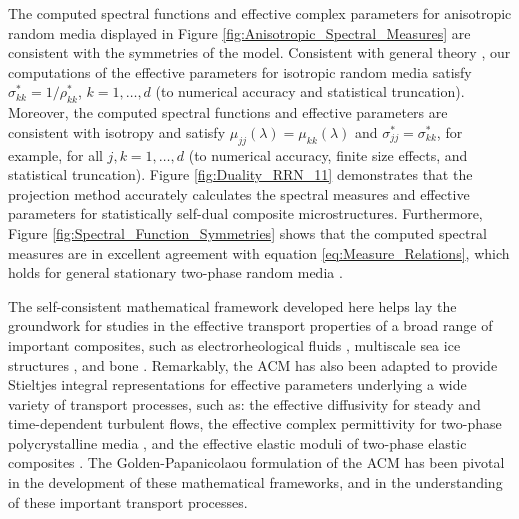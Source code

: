 \documentclass{cmslatex}
\renewcommand{\theequation}{\arabic{section}.\arabic{equation}}
\begin{document}
The computed spectral functions and effective complex parameters for
anisotropic random media displayed in Figure
\ref{fig:Anisotropic_Spectral_Measures}  are consistent with the
symmetries of the model. Consistent with general theory
\cite{MILTON:2002:TC}, our computations of the effective parameters
for isotropic random media 
satisfy $\sigma^*_{kk}=1/\rho^*_{kk}$, $k=1,\ldots,d$ (to numerical accuracy and
statistical truncation). Moreover, the computed spectral functions and
effective parameters are consistent with isotropy and satisfy
$\mu_{jj}(\lambda)=\mu_{kk}(\lambda)$ and $\sigma^*_{jj}=\sigma^*_{kk}$, for example, for all
$j,k=1,\ldots,d$ (to numerical accuracy, finite size effects, and
statistical truncation). Figure
\ref{fig:Duality_RRN_11} demonstrates that the projection method
accurately calculates the spectral measures and 
effective parameters for statistically self-dual composite
microstructures. Furthermore, Figure
\ref{fig:Spectral_Function_Symmetries} shows that the computed 
spectral measures are in excellent agreement with equation
\eqref{eq:Measure_Relations}, which holds for general stationary
two-phase random media \cite{Murphy:JMP:063506}. 



The self-consistent mathematical framework developed here helps lay
the groundwork for studies in the effective transport properties of a
broad range of important composites, such as electrorheological
fluids \cite{Murphy_Thermo_Stat_Mech}, multiscale sea ice structures
\cite{Murphy_Multiscale_Sea_Ice}, and bone
\cite{Golden:JBM:337}. Remarkably, the ACM  has also been
adapted to provide Stieltjes integral representations for 
effective parameters underlying a wide variety of transport processes,
such as: the effective diffusivity for steady
\cite{McLaughlin:SIAM_JAM:780,Avellaneda:CMP-339,Murphy_Advective_Diffusion}
and time-dependent \cite{Avellaneda:PRE:3249} turbulent flows, the
effective complex permittivity for two-phase polycrystalline media 
\cite{Barabash:JPCM:10323,Gully_Golden_Polycrystalline}, and the
effective elastic moduli of two-phase elastic composites
\cite{Ou:2012:411,Ou:MMAS:655}. The Golden-Papanicolaou formulation of
the ACM has been pivotal in the development of these mathematical
frameworks, and in the understanding of these important transport
processes. 



  \setcounter{equation}{1}  %
  \setcounter{section}{0}  %
  \renewcommand{\theequation}{A-\arabic{equation}}
\renewcommand{\thesection}{A-\arabic{section}}
\end{document}
